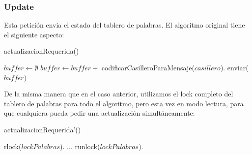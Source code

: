 \subsubsection{Update}

Esta petición envia el estado del tablero de palabras. El algoritmo original tiene el siguiente aspecto:

\begin{algorithm}[H]
\caption{actualizacionRequerida()}
\begin{algorithmic}[1]
    \STATE $buffer \leftarrow \emptyset$
        \STATE $buffer \leftarrow buffer +$ codificarCasilleroParaMensaje($casillero$).
    \ENDFOR
    \STATE enviar($buffer$)
\end{algorithmic}
\end{algorithm}

\noindent De la misma manera que en el caso anterior, utilizamos el lock completo del tablero de palabras para todo el algoritmo, pero esta vez en modo lectura, para que cualquiera pueda pedir una actualización simultáneamente:

\begin{algorithm}[H]
\caption{actualizacionRequerida'()}
\begin{algorithmic}[1]
    \STATE rlock($lockPalabras$).
    \STATE ...
    \STATE runlock($lockPalabras$).
\end{algorithmic}
\end{algorithm}
